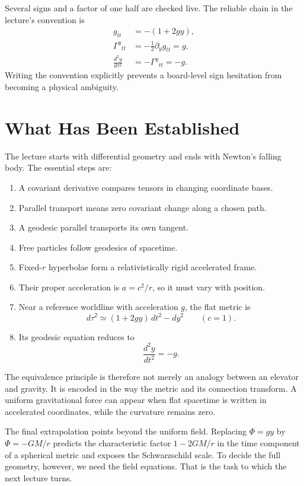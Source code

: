 Several signs and a factor of one half are checked live. The reliable chain in the lecture's convention is
\begin{equation}
\begin{aligned}
g_{tt}&=-(1+2gy),\\
\Gamma^y{}_{tt}&=-\frac12\partial_yg_{tt}=g,\\
\frac{d^2y}{d\tau^2}&=-\Gamma^y{}_{tt}=-g.
\end{aligned}
\end{equation}
Writing the convention explicitly prevents a board-level sign hesitation from becoming a physical ambiguity.

\section{What Has Been Established}

The lecture starts with differential geometry and ends with Newton's falling body. The essential steps are:
\begin{enumerate}
\item A covariant derivative compares tensors in changing coordinate bases.
\item Parallel transport means zero covariant change along a chosen path.
\item A geodesic parallel transports its own tangent.
\item Free particles follow geodesics of spacetime.
\item Fixed-\(r\) hyperbolae form a relativistically rigid accelerated frame.
\item Their proper acceleration is \(a=c^2/r\), so it must vary with position.
\item Near a reference worldline with acceleration \(g\), the flat metric is
\begin{equation}
d\tau^2\simeq(1+2gy)\,dt^2-dy^2
\qquad(c=1).
\end{equation}
\item Its geodesic equation reduces to
\begin{equation}
\frac{d^2y}{dt^2}=-g.
\end{equation}
\end{enumerate}

The equivalence principle is therefore not merely an analogy between an elevator and gravity. It is encoded in the way the metric and its connection transform. A uniform gravitational force can appear when flat spacetime is written in accelerated coordinates, while the curvature remains zero.

The final extrapolation points beyond the uniform field. Replacing \(\Phi=gy\) by \(\Phi=-GM/r\) predicts the characteristic factor \(1-2GM/r\) in the time component of a spherical metric and exposes the Schwarzschild scale. To decide the full geometry, however, we need the field equations. That is the task to which the next lecture turns.
